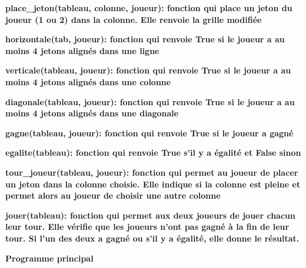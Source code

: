 \documentclass[11pt]{article}
\begin{document}
    \vspace{1.0cm}

    \textbf{place\_jeton(tableau, colonne, joueur): fonction qui place un jeton du joueur (1 ou 2) dans la colonne. Elle renvoie la grille modifiée}
    

    \newpage

    \textbf{horizontale(tab, joueur): fonction qui renvoie True si le joueur a au moins 4 jetons alignés dans une ligne}
    

    \vspace{1.0cm}

    \textbf{verticale(tableau, joueur): fonction qui renvoie True si le joueur a au moins 4 jetons alignés dans une colonne}
    

    \newpage

    \textbf{diagonale(tableau, joueur): fonction qui renvoie True si le joueur a au moins 4 jetons alignés dans une diagonale}
    

    \vspace{1.0cm}

    \textbf{gagne(tableau, joueur): fonction qui renvoie True si le joueur a gagné}
    

    \newpage

    \textbf{egalite(tableau): fonction qui renvoie True s’il y a égalité et False sinon}
    

    \newpage

    \textbf{tour\_joueur(tableau, joueur): fonction qui permet au joueur de placer un jeton dans la colonne choisie. Elle indique si la colonne est pleine et permet alors au joueur de choisir une autre colonne}
    

    \newpage

    \textbf{jouer(tableau): fonction qui permet aux deux joueurs de jouer chacun leur tour. Elle vérifie que les joueurs n’ont pas gagné à la fin de leur tour. Si l’un des deux a gagné ou s’il y a égalité, elle donne le résultat.}
    

    \newpage

    \textbf{Programme principal}
    
\end{document}
